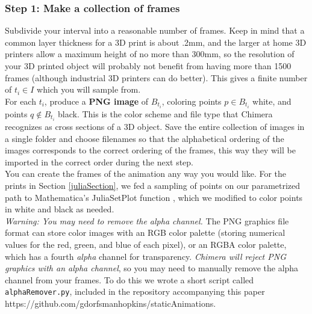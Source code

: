 \documentclass[12 pt]{article}
\begin{document}
\subsubsection*{Step 1: Make a collection of frames}
Subdivide your interval into a reasonable number of frames.  Keep in mind that a common layer thickness for a 3D print is about .2mm, and the larger at home 3D printers allow a maximum height of no more than 300mm, so the resolution of your 3D printed object will probably not benefit from having more than 1500 frames (although industrial 3D printers can do better).  This gives a finite number of $t_i\in I$ which you will sample from.\\

For each $t_i$, produce a \textbf{PNG image} of $B_{t_i}$, coloring points $p\in B_{t_i}$ white, and points $q\notin B_{t_i}$ black.  This is the color scheme and file type that Chimera recognizes as cross sections of a 3D object.  Save the entire collection of images in a single folder and choose filenames so that the alphabetical ordering of the images corresponds to the correct ordering of the frames, this way they will be imported in the correct order during the next step.\\

You can create the frames of the animation any way you would like.  For the prints in Section \ref{juliaSection}, we fed a sampling of points on our parametrized path to Mathematica's JuliaSetPlot function \cite{Mathematica}, which we modified to color points in white and black as needed.\\

\textit{Warning: You may need to remove the alpha channel.}  The PNG graphics file format can store color images with an RGB color palette (storing numerical values for the red, green, and blue of each pixel), or an RGBA color palette, which has a fourth \textit{alpha} channel for transparency.  \textit{Chimera will reject PNG graphics with an alpha channel}, so  you may need to manually remove the alpha channel from your frames.  To do this we wrote a short script called \verb|alphaRemover.py|, included in the repository accompanying this paper https://github.com/gdorfsmanhopkins/staticAnimations.
\end{document}
